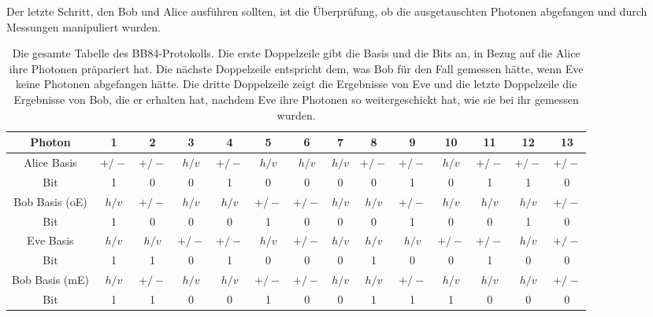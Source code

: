 Der letzte Schritt, den Bob und Alice ausf\"uhren sollten, ist die \"Uberpr\"ufung, ob die ausgetauschten
Photonen abgefangen und durch Messungen manipuliert wurden. 
\begin{table}[htb]
\begin{tabular}{c|c|c|c|c|c|c|c|c|c|c|c|c|c}
{\small Photon} & 1 & 2 & 3 & 4 & 5 & 6 & 7 & 8 & 9 & 10 & 11 & 12 & 13  \\ \hline
{\small Alice Basis} & ${\scriptstyle +/-}$ & ${\scriptstyle +/-}$ & ${\scriptstyle h/v}$ & ${\scriptstyle +/-}$ & ${\scriptstyle h/v}$ & ${\scriptstyle h/v}$ 
          & ${\scriptstyle h/v}$ & ${\scriptstyle +/-}$ & ${\scriptstyle +/-}$ & ${\scriptstyle h/v}$ & ${\scriptstyle +/-}$ 
          & ${\scriptstyle +/-}$  & ${\scriptstyle +/-}$  \\
{\small Bit} & 1 & 0 & 0 & 1 & 0 & 0 & 0 & 0 & 1 & 0 & 1 & 1 & 0 \\ \hline      
{\small Bob Basis (oE)} & ${\scriptstyle h/v}$ & ${\scriptstyle +/-}$ & ${\scriptstyle h/v}$ & ${\scriptstyle h/v}$ & ${\scriptstyle +/-}$ & ${\scriptstyle +/-}$ 
          & ${\scriptstyle h/v}$ & ${\scriptstyle h/v}$ & ${\scriptstyle +/-}$ & ${\scriptstyle h/v}$ & ${\scriptstyle h/v}$ & ${\scriptstyle h/v}$ 
          & ${\scriptstyle +/-}$   \\
{\small Bit} & 1 & 0 & 0 & 0 & 1 & 0 & 0 & 0 & 1 & 0 & 0 & 1 & 0   \\    \hline
{\small Eve Basis}  & ${\scriptstyle h/v}$ & ${\scriptstyle h/v}$ & ${\scriptstyle +/-}$ & ${\scriptstyle +/-}$ & ${\scriptstyle h/v}$ & ${\scriptstyle +/-}$ 
         & ${\scriptstyle h/v}$ &${\scriptstyle h/v}$ &${\scriptstyle h/v}$ & ${\scriptstyle +/-}$ & ${\scriptstyle +/-}$ & ${\scriptstyle h/v}$ 
         & ${\scriptstyle +/-}$ \\
{\small Bit} & 1 & 1 & 0 & 1 & 0 & 0 & 0 & 1 & 0 & 0 & 1 & 0 & 0  \\ \hline     
{\small Bob Basis (mE)} & ${\scriptstyle h/v}$ & ${\scriptstyle +/-}$ & ${\scriptstyle h/v}$ & ${\scriptstyle h/v}$ & ${\scriptstyle +/-}$ 
         & ${\scriptstyle +/-}$ & ${\scriptstyle h/v}$ & ${\scriptstyle h/v}$ & ${\scriptstyle +/-}$ & ${\scriptstyle h/v}$ & ${\scriptstyle h/v}$ 
         & ${\scriptstyle h/v}$ & ${\scriptstyle +/-}$   \\
{\small Bit} & 1 & 1 & 0 & 0 & 1 & 0 & 0 & 1 & 1 & 1 & 0 & 0 & 0   \\    \hline
\end{tabular}
\caption{\label{tab_QKgesamt}%
Die gesamte Tabelle des BB84-Protokolls. Die erste Doppelzeile gibt die Basis und die Bits an, in
Bezug auf die Alice ihre Photonen pr\"apariert hat. Die n\"achste Doppelzeile entspricht dem, was Bob
f\"ur den Fall gemessen h\"atte, wenn Eve keine Photonen abgefangen h\"atte. Die dritte Doppelzeile zeigt die
Ergebnisse von Eve und die letzte Doppelzeile die Ergebnisse von Bob, die er erhalten hat, nachdem Eve
ihre Photonen so weitergeschickt hat, wie sie bei ihr gemessen wurden.}
\end{table}

